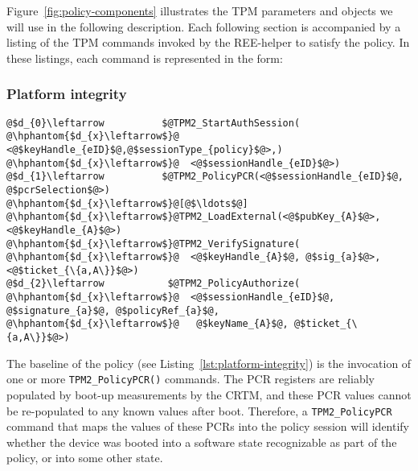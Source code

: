 \documentclass{sig-alternate-2013}
\begin{document}
Figure~\ref{fig:policy-components} illustrates the TPM parameters and objects we
will use in the following description. Each following section is accompanied by
a listing of the TPM commands invoked by the REE-helper to satisfy the policy.
In these listings, each command is represented in the form:

\vspace{\baselineskip}
\noindent
{}

\subsubsection{Platform integrity}
\label{sec:platform-integrity}

\begin{lstlisting}[float=tb,label={lst:platform-integrity},
caption={Platform integrity policy fragment}]
@$d_{0}\leftarrow          $@TPM2_StartAuthSession(
@\hphantom{$d_{x}\leftarrow$}@  <@$keyHandle_{eID}$@,@$sessionType_{policy}$@>,)
@\hphantom{$d_{x}\leftarrow$}@  <@$sessionHandle_{eID}$@>)
@$d_{1}\leftarrow          $@TPM2_PolicyPCR(<@$sessionHandle_{eID}$@, @$pcrSelection$@>)
@\hphantom{$d_{x}\leftarrow$}@[@$\ldots$@]
@\hphantom{$d_{x}\leftarrow$}@TPM2_LoadExternal(<@$pubKey_{A}$@>, <@$keyHandle_{A}$@>)
@\hphantom{$d_{x}\leftarrow$}@TPM2_VerifySignature(
@\hphantom{$d_{x}\leftarrow$}@  <@$keyHandle_{A}$@, @$sig_{a}$@>, <@$ticket_{\{a,A\}}$@>)
@$d_{2}\leftarrow           $@TPM2_PolicyAuthorize(
@\hphantom{$d_{x}\leftarrow$}@  <@$sessionHandle_{eID}$@, @$signature_{a}$@, @$policyRef_{a}$@,
@\hphantom{$d_{x}\leftarrow$}@   @$keyName_{A}$@, @$ticket_{\{a,A\}}$@>)
\end{lstlisting}

The baseline of the policy (see Listing~\ref{lst:platform-integrity}) is the
invocation of one or more \texttt{TPM2\_PolicyPCR()} commands. The PCR registers
are reliably populated by boot-up measurements by the CRTM, and these PCR values
cannot be re-populated to any known values after boot. Therefore, a
\texttt{TPM2\_PolicyPCR} command that maps the values of these PCRs into the
policy session will identify whether the device was booted into a software state
recognizable as part of the policy, or into some other state.
\end{document}
